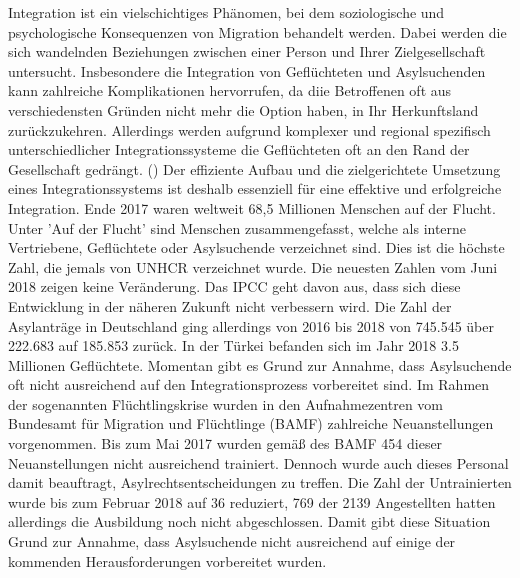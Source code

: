 

Integration ist ein vielschichtiges Phänomen, bei dem soziologische und psychologische Konsequenzen von Migration behandelt werden. 
Dabei werden die sich wandelnden Beziehungen zwischen einer Person und Ihrer Zielgesellschaft untersucht.\newline
Insbesondere die Integration von Geflüchteten und Asylsuchenden kann zahlreiche Komplikationen hervorrufen, da diie Betroffenen oft aus verschiedensten Gründen nicht mehr die Option haben, in Ihr Herkunftsland zurückzukehren.\newline
Allerdings werden aufgrund komplexer und regional spezifisch unterschiedlicher Integrationssysteme die Geflüchteten oft an den Rand der Gesellschaft gedrängt. (\cite{oduntan2017investigating})\newline
Der effiziente Aufbau und die zielgerichtete Umsetzung eines Integrationssystems ist deshalb essenziell für eine effektive und erfolgreiche Integration.\newline
Ende 2017 waren weltweit 68,5 Millionen Menschen auf der Flucht. Unter 'Auf der Flucht'  sind Menschen zusammengefasst, welche als interne Vertriebene, Gefl\"uchtete oder Asylsuchende verzeichnet sind. Dies ist die h\"ochste Zahl, die jemals von UNHCR verzeichnet wurde.\cite{uno2018flucht}
Die neuesten Zahlen vom Juni 2018 zeigen keine Ver\"anderung.\newline
Das IPCC geht davon aus, dass sich diese Entwicklung in der n\"aheren Zukunft nicht verbessern wird. \cite{sr15ipcc}\newline
Die Zahl der Asylantr\"age in Deutschland ging allerdings von 2016 bis 2018 von 745.545 \"uber 222.683 auf 185.853 zur\"uck. \cite{statistica2019asyl} In der T\"urkei befanden sich im Jahr 2018 3.5 Millionen Gefl\"uchtete.\newline
\newline
Momentan gibt es Grund zur Annahme, dass Asylsuchende oft nicht ausreichend auf den Integrationsprozess vorbereitet sind. \cite{oduntan2017information} \cite{gillespie2016mapping}\newline
Im Rahmen der sogenannten Fl\"uchtlingskrise wurden in den Aufnahmezentren vom {Bundesamt f\"ur Migration und Fl\"uchtlinge} (BAMF) zahlreiche Neuanstellungen vorgenommen. Bis zum Mai 2017 wurden gem\"a\ss{} des BAMF 454 dieser Neuanstellungen nicht ausreichend trainiert. Dennoch wurde auch dieses Personal damit beauftragt, Asylrechtsentscheidungen zu treffen.\newline
Die Zahl der Untrainierten wurde bis zum Februar 2018 auf 36 reduziert, 769 der 2139 Angestellten hatten allerdings die Ausbildung noch nicht abgeschlossen.\newline
Damit gibt diese Situation Grund zur Annahme, dass Asylsuchende nicht ausreichend auf einige der kommenden Herausforderungen vorbereitet wurden. \cite{asylum2018bamf}\newline





